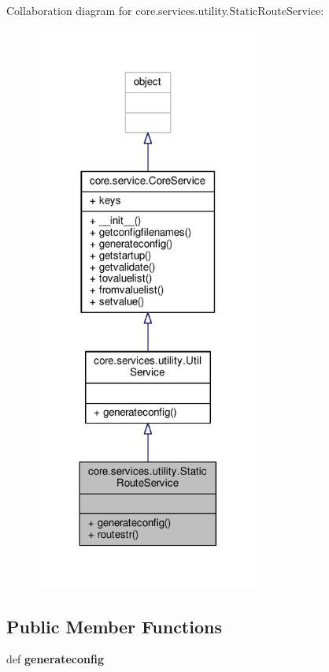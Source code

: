 Collaboration diagram for core.\+services.\+utility.\+Static\+Route\+Service\+:
\nopagebreak
\begin{figure}[H]
\begin{center}
\leavevmode
\includegraphics[width=210pt]{classcore_1_1services_1_1utility_1_1_static_route_service__coll__graph}
\end{center}
\end{figure}
\subsection*{Public Member Functions}
\begin{DoxyCompactItemize}
\item 
\hypertarget{classcore_1_1services_1_1utility_1_1_static_route_service_ae6c49e1a6b94d7106be971b7749cac15}{def {\bfseries generateconfig}}\label{classcore_1_1services_1_1utility_1_1_static_route_service_ae6c49e1a6b94d7106be971b7749cac15}

\end{DoxyCompactItemize}
